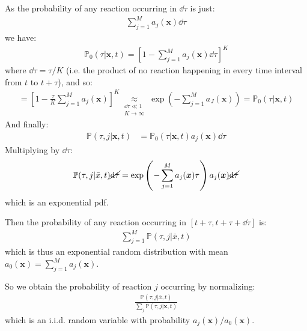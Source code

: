 \documentclass[../template.tex]{subfiles}
\begin{document}
As the probability of any reaction occurring in $\dd{\tau}$ is just:
\begin{align*}
    \sum_{j=1}^M a_j(\bm{x}) \dd{\tau}
\end{align*}
we have:
\begin{align*}
    \mathbb{P}_0(\tau|\bm{x},t) = \left[1 - \sum_{j=1}^M a_j(\bm{x}) \dd{\tau}\right]^K
\end{align*}
where $\dd{\tau} = \tau/K$ (i.e. the product of no reaction happening in every time interval from $t$ to $t+ \tau$), and so:
\begin{align*}
    = \left[1- \frac{\tau}{K} \sum_{j=1}^M a_j(\bm{x}) \right]^K \underset{\substack{\dd{\tau} \ll 1\\K \to \infty}}{\approx} \exp\left(-\sum_{j=1}^M a_J(\bm{x})\right) = \mathbb{P}_0(\tau|\bm{x}, t)
\end{align*}
And finally:
\begin{align*}
    \mathbb{P}(\tau, j|\bm{x},t) &= \mathbb{P}_0(\tau|\bm{x},t) a_j(\bm{x}) \dd{\tau}
\end{align*}
Multiplying by $\dd{\tau}$:
\begin{align*}
    \mathbb{P}(\tau, j|\bar{x},t) \cancel{\dd{\tau}} = \exp\left(-\sum_{j=1}^M a_j(\bm{x}) \tau \right) a_j(\bm{x}) \cancel{\dd{\tau}}
\end{align*}
which is an exponential pdf.

Then the probability of any reaction occurring in $[t+\tau, t+\tau + \dd{\tau}]$ is:
\begin{align*}
    \sum_{j=1}^M \mathbb{P}(\tau, j |\bar{x},t)
\end{align*}
which is thus an exponential random distribution with mean $a_0(\bm{x}) = \sum_{j=1}^M a_j(\bm{x})$.

So we obtain the probability of reaction $j$ occurring by normalizing:
\begin{align*}
    \frac{\mathbb{P}(\tau, j|\bar{x}, t)}{\sum_j \mathbb{P}(\tau, j|\bm{x},t)} 
\end{align*}
which is an i.i.d. random variable with probability $a_j(\bm{x})/a_0(\bm{x})$.
\end{document}
